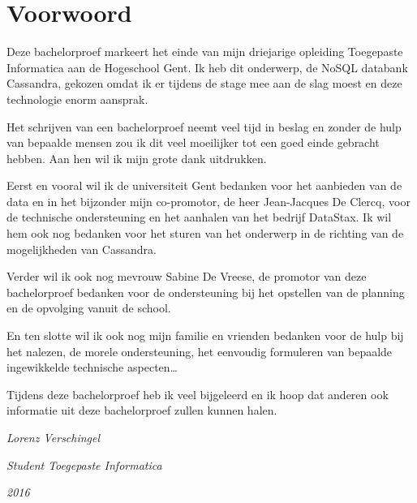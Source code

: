 \chapter*{Voorwoord}
\label{ch:voorwoord}

Deze bachelorproef markeert het einde van mijn driejarige opleiding Toegepaste Informatica aan de Hogeschool Gent.
Ik heb dit onderwerp, de NoSQL databank Cassandra, gekozen omdat ik er tijdens de stage mee aan de slag moest en deze technologie enorm aansprak.

Het schrijven van een bachelorproef neemt veel tijd in beslag en zonder de hulp van bepaalde mensen zou ik dit veel moeilijker tot een goed einde gebracht hebben.
Aan hen wil ik mijn grote dank uitdrukken.

Eerst en vooral wil ik de universiteit Gent bedanken voor het aanbieden van de data en in het bijzonder mijn co-promotor, de heer Jean-Jacques De Clercq, voor de technische ondersteuning en het aanhalen van het bedrijf DataStax.
Ik wil hem ook nog bedanken voor het sturen van het onderwerp in de richting van de mogelijkheden van Cassandra.

Verder wil ik ook nog mevrouw Sabine De Vreese, de promotor van deze bachelorproef bedanken voor de ondersteuning bij het opstellen van de planning en de opvolging vanuit de school.

En ten slotte wil ik ook nog mijn familie en vrienden bedanken voor de hulp bij het nalezen, de morele ondersteuning, het eenvoudig formuleren van bepaalde ingewikkelde technische aspecten\dots

Tijdens deze bachelorproef heb ik veel bijgeleerd en ik hoop dat anderen ook informatie uit deze bachelorproef zullen kunnen halen.

\vspace{4 em}

\begin{flushright}
	\textit{Lorenz Verschingel}	
\end{flushright}
\begin{flushright}
	\textit{Student Toegepaste Informatica}
\end{flushright}
\begin{flushright}
	\textit{2016}
\end{flushright}
